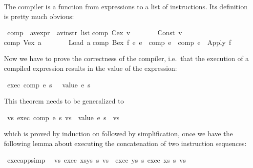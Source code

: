 \begin{isabellebody}
\begin{isamarkuptext}
The compiler is a function from expressions to a list of instructions. Its
definition is pretty much obvious:%
\end{isamarkuptext}%
\ comp\ {\isacharcolon}{\isacharcolon}\ {\isachardoublequote}{\isacharparenleft}{\isacharprime}a{\isacharcomma}{\isacharprime}v{\isacharparenright}expr\ {\isasymRightarrow}\ {\isacharparenleft}{\isacharprime}a{\isacharcomma}{\isacharprime}v{\isacharparenright}instr\ list{\isachardoublequote}\isanewline
{}\isanewline
{\isachardoublequote}comp\ {\isacharparenleft}Cex\ v{\isacharparenright}\ \ \ \ \ \ \ {\isacharequal}\ {\isacharbrackleft}Const\ v{\isacharbrackright}{\isachardoublequote}\isanewline
{\isachardoublequote}comp\ {\isacharparenleft}Vex\ a{\isacharparenright}\ \ \ \ \ \ \ {\isacharequal}\ {\isacharbrackleft}Load\ a{\isacharbrackright}{\isachardoublequote}\isanewline
{\isachardoublequote}comp\ {\isacharparenleft}Bex\ f\ e\ e\ {\isacharequal}\ {\isacharparenleft}comp\ e\ {\isacharat}\ {\isacharparenleft}comp\ e\ {\isacharat}\ {\isacharbrackleft}Apply\ f{\isacharbrackright}{\isachardoublequote}%
\begin{isamarkuptext}%
Now we have to prove the correctness of the compiler, i.e.\ that the
execution of a compiled expression results in the value of the expression:%
\end{isamarkuptext}%
\ {\isachardoublequote}exec\ {\isacharparenleft}comp\ e{\isacharparenright}\ s\ {\isacharbrackleft}{\isacharbrackright}\ {\isacharequal}\ {\isacharbrackleft}value\ e\ s{\isacharbrackright}{\isachardoublequote}%
\begin{isamarkuptext}%
\noindent
This theorem needs to be generalized to%
\end{isamarkuptext}%
\ {\isachardoublequote}{\isasymforall}vs{\isachardot}\ exec\ {\isacharparenleft}comp\ e{\isacharparenright}\ s\ vs\ {\isacharequal}\ {\isacharparenleft}value\ e\ s{\isacharparenright}\ {\isacharhash}\ vs{\isachardoublequote}%
\begin{isamarkuptxt}%
\noindent
which is proved by induction on  followed by simplification, once
we have the following lemma about executing the concatenation of two
instruction sequences:%
\end{isamarkuptxt}%
\ exec{\isacharunderscore}app{\isacharbrackleft}simp{\isacharbrackright}{\isacharcolon}\isanewline
\ \ {\isachardoublequote}{\isasymforall}vs{\isachardot}\ exec\ {\isacharparenleft}xs{\isacharat}ys{\isacharparenright}\ s\ vs\ {\isacharequal}\ exec\ ys\ s\ {\isacharparenleft}exec\ xs\ s\ vs{\isacharparenright}{\isachardoublequote}%

\end{isabellebody}
